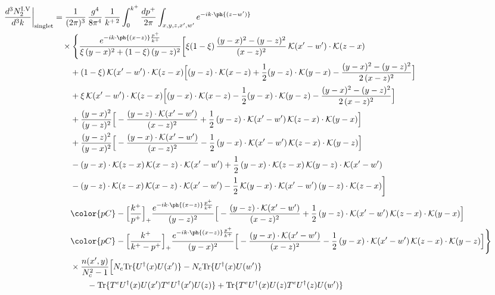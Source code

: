 \begin{align}
\frac{d^{3}N^{\rm I.V}_{2}}{d^{3}k}\bigg|_{\rm singlet} & =\frac{1}{(2\pi)^{3}}\,\frac{g^{4}}{8\pi^{4}}\,\frac{1}{k^{+\,2}}\int_{0}^{k^{+}}\frac{dp^{+}}{2\pi}\int_{x,y,z,x',w'}e^{-ik\cdot\ph{(z-w')}}\notag\\
&\quad\times\Bigg\{\frac{e^{-ik\cdot\ph{(x-z)}\frac{p^{+}}{k^{+}}}}{\xi\,(y-x)^{2}+(1-\xi)\,(y-z)^{2}}\bigg[\xi(1-\xi)\,\frac{(y-x)^{2}-(y-z)^{2}}{(x-z)^{2}}\,\mathcal{K}(x'-w')\cdot\mathcal{K}(z-x)\notag\\
&\qquad+(1-\xi)\,\mathcal{K}(x'-w')\cdot\mathcal{K}(z-x)\Big[(y-z)\cdot\mathcal{K}(x-z)+\frac{1}{2}(y-z)\cdot\mathcal{K}(y-x)-\frac{(y-x)^{2}-(y-z)^{2}}{2\,(x-z)^{2}}\Big]\notag\\
&\qquad+\xi\,\mathcal{K}(x'-w')\cdot\mathcal{K}(z-x)\Big[(y-x)\cdot\mathcal{K}(x-z)-\frac{1}{2}(y-x)\cdot\mathcal{K}(y-z)-\frac{(y-x)^{2}-(y-z)^{2}}{2\,(x-z)^{2}}\Big]\notag\\
&\qquad+\frac{(y-x)^{2}}{(y-z)^{2}}\Big[-\frac{(y-z)\cdot\mathcal{K}(x'-w')}{(x-z)^{2}}+\frac{1}{2}\,(y-z)\cdot\mathcal{K}(x'-w')\,\mathcal{K}(z-x)\cdot\mathcal{K}(y-x)\Big]\notag\\
&\qquad+\frac{(y-z)^{2}}{(y-x)^{2}}\Big[-\frac{(y-x)\cdot\mathcal{K}(x'-w')}{(x-z)^{2}}-\frac{1}{2}\,(y-x)\cdot\mathcal{K}(x'-w')\,\mathcal{K}(z-x)\cdot\mathcal{K}(y-z)\Big]\notag\\
&\qquad-(y-x)\cdot\mathcal{K}(z-x)\,\mathcal{K}(x-z)\cdot\mathcal{K}(x'-w')+\frac{1}{2}\,(y-x)\cdot\mathcal{K}(z-x)\,\mathcal{K}(y-z)\cdot\mathcal{K}(x'-w')\notag\\
&\qquad-(y-z)\cdot\mathcal{K}(z-x)\,\mathcal{K}(x-z)\cdot\mathcal{K}(x'-w')-\frac{1}{2}\,\mathcal{K}(y-x)\cdot\mathcal{K}(x'-w')\,(y-z)\cdot\mathcal{K}(z-x)\bigg]\notag\\
&\qquad{\color{pC}-\Big[\frac{k^{+}}{p^{+}}\Big]_{+}\frac{e^{-ik\cdot\ph{(x-z)}\frac{p^{+}}{k^{+}}}}{(y-z)^{2}}\Big[-\frac{(y-z)\cdot\mathcal{K}(x'-w')}{(x-z)^{2}}+\frac{1}{2}\,(y-z)\cdot\mathcal{K}(x'-w')\,\mathcal{K}(z-x)\cdot\mathcal{K}(y-x)\Big]}\notag\\
&\qquad{\color{pC}-\Big[\frac{k^{+}}{k^{+}-p^{+}}\Big]_{+}\frac{e^{-ik\cdot\ph{(x-z)}\frac{p^{+}}{k^{+}}}}{(y-x)^{2}}\Big[-\frac{(y-x)\cdot\mathcal{K}(x'-w')}{(x-z)^{2}}-\frac{1}{2}\,(y-x)\cdot\mathcal{K}(x'-w')\,\mathcal{K}(z-x)\cdot\mathcal{K}(y-z)\Big]}\Bigg\}\notag\\
&\qquad\times\frac{n(x',y)}{N_{c}^{2}-1}\Big[N_{c}{\rm Tr}\{U^{\dagger}(x)U(x')\}-N_{c}{\rm Tr}\{U^{\dagger}(x)U(w')\}\notag\\ &\qquad\qquad-{\rm Tr}\{T^{e}U^{\dagger}(x)U(x')T^{e}U^{\dagger}(x')U(z)\}+{\rm Tr}\{T^{e}U^{\dagger}(x)U(z)T^{e}U^{\dagger}(z)U(w')\}\notag\\

\end{align}
